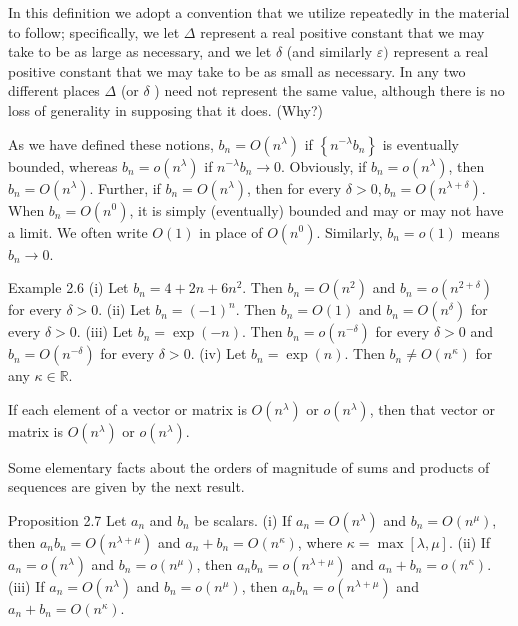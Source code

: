 \documentclass[10pt]{article}
\begin{document}
In this definition we adopt a convention that we utilize repeatedly in the material to follow; specifically, we let $\Delta$ represent a real positive constant that we may take to be as large as necessary, and we let $\delta$ (and similarly $\varepsilon)$ represent a real positive constant that we may take to be as small as necessary. In any two different places $\Delta$ (or $\delta$ ) need not represent the same value, although there is no loss of generality in supposing that it does. (Why?)

As we have defined these notions, $b_{n}=O\left(n^{\lambda}\right)$ if $\left\{n^{-\lambda} b_{n}\right\}$ is eventually bounded, whereas $b_{n}=o\left(n^{\lambda}\right)$ if $n^{-\lambda} b_{n} \rightarrow 0$. Obviously, if $b_{n}=o\left(n^{\lambda}\right)$, then $b_{n}=O\left(n^{\lambda}\right)$. Further, if $b_{n}=O\left(n^{\lambda}\right)$, then for every $\delta>0, b_{n}=O\left(n^{\lambda+\delta}\right)$. When $b_{n}=O\left(n^{0}\right)$, it is simply (eventually) bounded and may or may not have a limit. We often write $O(1)$ in place of $O\left(n^{0}\right)$. Similarly, $b_{n}=o(1)$ means $b_{n} \rightarrow 0$.

Example 2.6 (i) Let $b_{n}=4+2 n+6 n^{2}$. Then $b_{n}=O\left(n^{2}\right)$ and $b_{n}= o\left(n^{2+\delta}\right)$ for every $\delta>0$. (ii) Let $b_{n}=(-1)^{n}$. Then $b_{n}=O(1)$ and $b_{n}= O\left(n^{\delta}\right)$ for every $\delta>0$. (iii) Let $b_{n}=\exp (-n)$. Then $b_{n}=o\left(n^{-\delta}\right)$ for every $\delta>0$ and $b_{n}=O\left(n^{-\delta}\right)$ for every $\delta>0$. (iv) Let $b_{n}=\exp (n)$. Then $b_{n} \neq O\left(n^{\kappa}\right)$ for any $\kappa \in \mathbb{R}$.

If each element of a vector or matrix is $O\left(n^{\lambda}\right)$ or $o\left(n^{\lambda}\right)$, then that vector or matrix is $O\left(n^{\lambda}\right)$ or $o\left(n^{\lambda}\right)$.

Some elementary facts about the orders of magnitude of sums and products of sequences are given by the next result.

Proposition 2.7 Let $a_{n}$ and $b_{n}$ be scalars. (i) If $a_{n}=O\left(n^{\lambda}\right)$ and $b_{n}= O\left(n^{\mu}\right)$, then $a_{n} b_{n}=O\left(n^{\lambda+\mu}\right)$ and $a_{n}+b_{n}=O\left(n^{\kappa}\right)$, where $\kappa=\max [\lambda, \mu]$. (ii) If $a_{n}=o\left(n^{\lambda}\right)$ and $b_{n}=o\left(n^{\mu}\right)$, then $a_{n} b_{n}=o\left(n^{\lambda+\mu}\right)$ and $a_{n}+b_{n}= o\left(n^{\kappa}\right)$. (iii) If $a_{n}=O\left(n^{\lambda}\right)$ and $b_{n}=o\left(n^{\mu}\right)$, then $a_{n} b_{n}=o\left(n^{\lambda+\mu}\right)$ and $a_{n}+b_{n}=O\left(n^{\kappa}\right)$.
\end{document}
